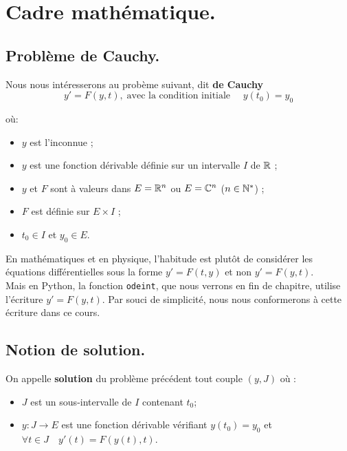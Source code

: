 \section{Cadre mathématique.}

\subsection{Problème de Cauchy.}

Nous nous intéresserons au probème suivant, dit \textbf{de Cauchy} 
\begin{equation}
  \label{eq:o1}
  y' = F(y,t), \;\text{avec la condition initiale }\quad y(t_{0})=y_{0} 
\end{equation}


où:
\begin{itemize}
\item $y$ est l'inconnue ;
\item $y$ est une fonction dérivable définie sur un intervalle $I$ de $\mathbb{R}$ ;
\item $y$ et $F$ sont à valeurs dans $E = \mathbb{R}^{n}$ ou $E=\mathbb{C}^{n}$ ($n\in\mathbb{N}^{*}$) ;
\item $F$ est définie sur $E\times I$ ;
\item $t_{0}\in I$ et $y_{0}\in E$.
\end{itemize}


\begin{rem}
En mathématiques et en physique, l'habitude est plutôt de considérer les équations 
différentielles sous la forme $y'=F(t,y)$ et non $y'=F(y,t)$.\\
Mais en Python, la fonction \texttt{odeint}, que nous verrons en fin de chapitre, 
utilise l'écriture $y'=F(y,t)$. Par souci de simplicité, nous nous conformerons à cette 
écriture dans ce cours.
\end{rem}


\subsection{Notion de solution.}

On appelle \textbf{solution} du problème précédent tout couple $(y,J)$ où :
\begin{itemize}
\item $J$ est un sous-intervalle de $I$ contenant $t_{0}$;
\item $y : J\to E$ est une fonction dérivable vérifiant $y(t_{0})=y_{0}$ et $    \forall t \in J\quad y'(t)=F(y(t),t)$.
\end{itemize}


